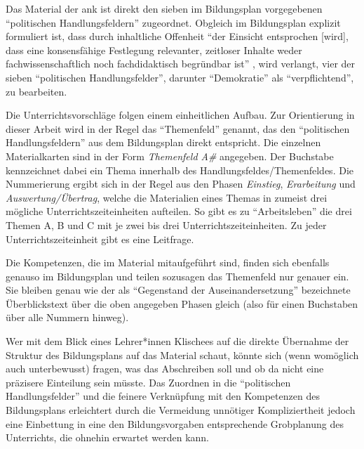 Das Material der \gls{ank} ist direkt den sieben im Bildungsplan vorgegebenen \enquote{politischen Handlungsfeldern} \autocite[3, 15]{bplan} zugeordnet.
Obgleich im Bildungsplan explizit formuliert ist, dass durch inhaltliche Offenheit \enquote{der Einsicht entsprochen [wird], dass eine konsensfähige Festlegung relevanter, zeitloser Inhalte weder fachwissenschaftlich noch fachdidaktisch begründbar ist} \autocite[15]{bplan}, wird verlangt, vier der sieben \enquote{politischen Handlungsfelder}, darunter \enquote{Demokratie} als \enquote{verpflichtend}, zu bearbeiten.

Die Unterrichtsvorschläge folgen einem einheitlichen Aufbau. Zur Orientierung in dieser Arbeit wird in der Regel das \enquote{Themenfeld} genannt, das den \enquote{politischen Handlungsfeldern} aus dem Bildungsplan direkt entspricht. 
Die einzelnen Materialkarten sind in der Form \emph{Themenfeld A\#} angegeben. 
Der Buchstabe kennzeichnet dabei ein Thema innerhalb des Handlungsfeldes/Themenfeldes.
Die Nummerierung ergibt sich in der Regel aus den Phasen \emph{Einstieg}, \emph{Erarbeitung} und \emph{Auswertung/Übertrag}, welche die Materialien eines Themas in zumeist drei mögliche Unterrichtszeiteinheiten aufteilen. So gibt es zu \enquote{Arbeitsleben} die drei Themen A, B und C mit je zwei bis drei Unterrichtszeiteinheiten.
Zu jeder Unterrichtszeiteinheit gibt es eine Leitfrage. %

Die Kompetenzen, die im Material mitaufgeführt sind, finden sich ebenfalls genauso im Bildungsplan und teilen sozusagen das Themenfeld nur genauer ein. Sie bleiben genau wie der als \enquote{Gegenstand der Auseinandersetzung} bezeichnete Überblickstext über die oben angegeben Phasen gleich (also für einen Buchstaben über alle Nummern hinweg). 



Wer mit dem Blick eines Lehrer*innen Klischees auf die direkte Übernahme der Struktur des Bildungsplans auf das Material schaut, könnte sich (wenn womöglich auch unterbewusst) fragen, was das Abschreiben soll und ob da nicht eine präzisere Einteilung sein müsste.
Das Zuordnen in die \enquote{politischen Handlungsfelder} und die feinere Verknüpfung mit den Kompetenzen des Bildungsplans erleichtert durch die Vermeidung unnötiger Kompliziertheit jedoch eine Einbettung in eine den Bildungsvorgaben entsprechende Grobplanung des Unterrichts, die ohnehin erwartet werden kann.



